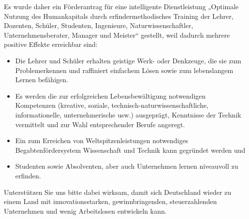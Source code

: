 \documentclass[11pt,a4paper]{article}
\begin{document}
Es wurde daher ein Förderantrag für eine intelligente Dienstleistung „Optimale
Nutzung des Humankapitals durch erfindermethodisches Training der Lehrer,
Dozenten, Schüler, Studenten, Ingenieure, Naturwissenschaftler,
Unternehmensberater, Manager und Meister“ gestellt, weil dadurch mehrere
positive Effekte erreichbar sind:
\begin{itemize}[noitemsep]
\item Die Lehrer und Schüler erhalten geistige Werk- oder Denkzeuge, die sie
  zum Problemerkennen und raffiniert einfachem Lösen sowie zum lebenslangem
  Lernen befähigen.
\item Es werden die zur erfolgreichen Lebensbewältigung notwendigen
  Kompetenzen (kreative, soziale, technisch-naturwissenschaftliche,
  informationelle, unternehmerische usw.) ausgeprägt, Kenntnisse der Technik
  vermittelt und zur Wahl entsprechender Berufe angeregt.
\item Ein zum Erreichen von Weltspitzenleistungen notwendiges
  Begabtenfördersystem Wissenschaft und Technik kann gegründet werden und
\item Studenten sowie Absolventen, aber auch Unternehmen lernen niveauvoll zu
  erfinden.
\end{itemize}
\enlargethispage{1em}
Unterstützen Sie uns bitte dabei wirksam, damit sich Deutschland wieder zu
einem Land mit innovationsstarken, gewinnbringenden, steuerzahlenden
Unternehmen und wenig Arbeitslosen entwickeln kann.

\end{document}
